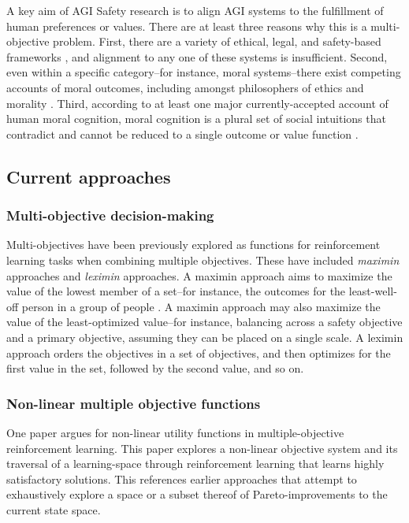 

A key aim of AGI Safety research is to align AGI systems to the fulfillment of human preferences \cite{Bostrom2014, russell2019human} or values. There are at least three reasons why this is a multi-objective problem. First, there are a variety of ethical, legal, and safety-based frameworks \cite{vamplew_human-aligned_2018}, and alignment to any one of these systems is insufficient. Second, even within a specific category--for instance, moral systems--there exist competing accounts of moral outcomes, including amongst philosophers of ethics and morality \cite{bogosian_implementation_2017}. Third, according to at least one major currently-accepted account of human moral cognition, moral cognition is a plural set of social intuitions that contradict and cannot be reduced to a single outcome or value function \cite{haidt2001emotional,sotala2016defining}.

\subsection{Current approaches}

\subsubsection{Multi-objective decision-making}
Multi-objectives have been previously explored \cite{vamplew_human-aligned_2018,vamplew_potential-based_2021} as functions for reinforcement learning tasks when combining multiple objectives. 
These have included \textit{maximin} approaches and \textit{leximin} approaches. A maximin approach aims to maximize the value of the lowest member of a set--for instance, the outcomes for the least-well-off person in a group of people \cite{rawls2001justice}. A maximin approach may also maximize the value of the least-optimized value--for instance, balancing across a safety objective and a primary objective, assuming they can be placed on a single scale. A leximin approach orders the objectives in a set of objectives, and then optimizes for the first value in the set, followed by the second value, and so on.

\subsubsection{Non-linear multiple objective functions}
One paper \cite{rolf_need_2020} argues for non-linear utility functions in multiple-objective reinforcement learning. This paper explores a non-linear objective system and its traversal of a learning-space through reinforcement learning that learns highly satisfactory solutions. This references earlier approaches that attempt to exhaustively explore \cite{van2014multi,parisi2016multi} a space or a subset thereof \cite{barrett2008learning} of Pareto-improvements to the current state space.

